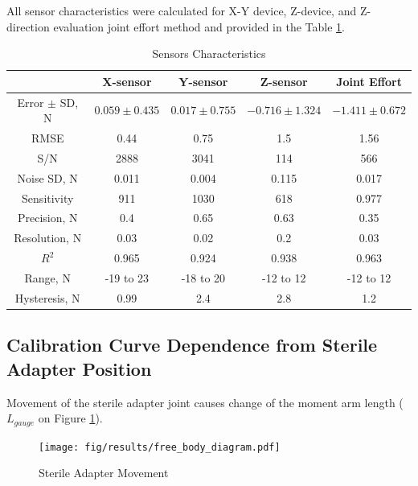 All sensor characteristics were calculated for X-Y device, Z-device, and Z-direction evaluation joint effort method and provided in the Table \ref{tab:SenChar}.

\begin{table}[h]
\caption {Sensors Characteristics} \label{tab:SenChar} 
\begin{center}
\begin{tabular}{ | c | c | c | c | c | } 
\hline
 &  X-sensor & Y-sensor & Z-sensor & Joint Effort \\ 
\hline
Error $\pm$ SD, N & $0.059 \pm 0.435$ & $0.017 \pm 0.755$ & $-0.716 \pm 1.324$ & $-1.411 \pm 0.672$ \\ 
\hline
RMSE & 0.44 & 0.75 & 1.5 & 1.56 \\ 
\hline
S/N & 2888 & 3041 & 114 & 566 \\
\hline
Noise SD, N & 0.011 & 0.004 & 0.115 & 0.017 \\
\hline
Sensitivity & 911 & 1030 & 618 & 0.977 \\
\hline
Precision, N & 0.4 & 0.65 & 0.63 & 0.35 \\
\hline
Resolution, N & 0.03 & 0.02 & 0.2 & 0.03 \\
\hline
$R^2$ & 0.965 & 0.924 & 0.938 & 0.963 \\
\hline
Range, N & -19 to 23 & -18 to 20 & -12 to 12 & -12 to 12 \\
\hline
Hysteresis, N & 0.99 & 2.4 & 2.8 & 1.2 \\
\hline
\end{tabular}
\end{center}
\end{table}

\subsection{Calibration Curve Dependence from Sterile Adapter Position}
	\label{sec:DisExp}
	
Movement of the sterile adapter joint causes change of the moment arm length ($L_{gauge}$ on Figure \ref{fig:Free_Body_Diagram}).	 	

\begin{figure}[h]
	\begin{center}
	\texttt{[image: fig/results/free\_body\_diagram.pdf]}
	\end{center}
	\vspace{-4mm}
	\caption[Sterile Adapter Movement]
	{Sterile Adapter Movement}
	\label{fig:Free_Body_Diagram}
	\vspace{-2mm}
\end{figure}

